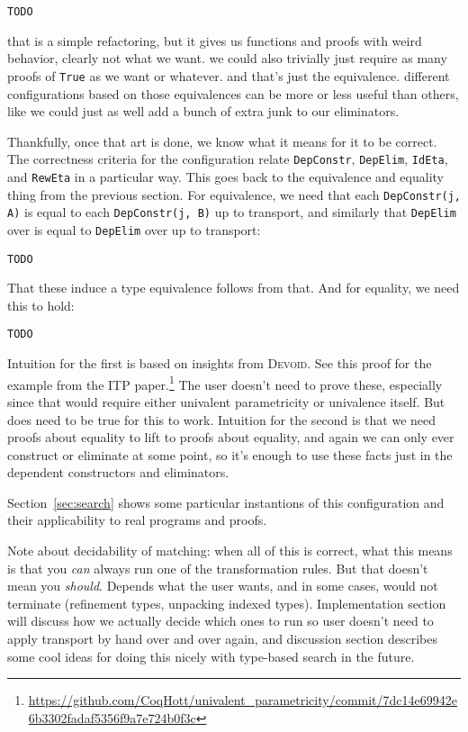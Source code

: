 \begin{lstlisting}
TODO
\end{lstlisting}
that is a simple refactoring, but it gives us functions and proofs with weird behavior, clearly not what we want.
we could also trivially just require as many proofs of \lstinline{True} as we want or whatever.
and that's just the equivalence.
different configurations based on those equivalences
can be more or less useful than others, %
like we could just as well add a bunch of extra junk to our eliminators.

Thankfully, once that art is done, we know what it means for it to be correct.
The correctness criteria for the configuration relate \lstinline{DepConstr}, \lstinline{DepElim}, \lstinline{IdEta}, and \lstinline{RewEta}
in a particular way.
This goes back to the equivalence and equality thing from the previous section.
For equivalence, we need that each \lstinline{DepConstr(j, A)} is equal to each \lstinline{DepConstr(j, B)} up to transport,
and similarly that \lstinline{DepElim} over \A is equal to \lstinline{DepElim} over \B up to transport:

\begin{lstlisting}
TODO
\end{lstlisting}
That these induce a type equivalence follows from that.
And for equality, we need this to hold:

\begin{lstlisting}
TODO
\end{lstlisting}
Intuition for the first is based on insights from \textsc{Devoid}.
See this proof for the example from the ITP paper.\footnote{\url{https://github.com/CoqHott/univalent_parametricity/commit/7dc14e69942e6b3302fadaf5356f9a7e724b0f3c}}
The user doesn't need to prove these, especially since that would require either univalent parametricity
or univalence itself.
But does need to be true for this to work.
Intuition for the second is that we need proofs about equality to lift to proofs about equality,
and again we can only ever construct or eliminate at some point, so it's enough
to use these facts just in the dependent constructors and eliminators.

Section~\ref{sec:search} shows some particular instantions of this configuration and their applicability to real programs and proofs.

Note about decidability of matching: when all of this is correct, what this means is that you \textit{can} always
run one of the transformation rules. But that doesn't mean you \textit{should}. Depends what the user wants,
and in some cases, would not terminate (refinement types, unpacking indexed types). Implementation section will
discuss how we actually decide which ones to run so user doesn't need to apply transport by hand over and over again,
and discussion section describes some cool ideas for doing this nicely with type-based search in the future.

